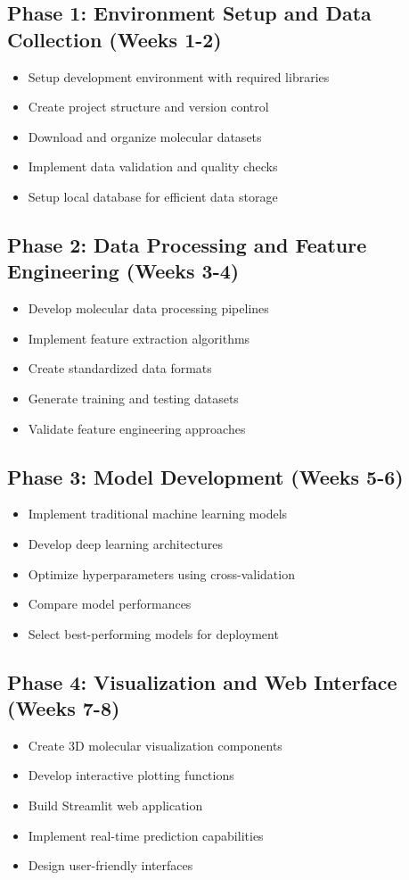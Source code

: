 \documentclass[12pt,a4paper]{article}
\begin{document}
\subsection{Phase 1: Environment Setup and Data Collection (Weeks 1-2)}
\begin{itemize}
    \item Setup development environment with required libraries
    \item Create project structure and version control
    \item Download and organize molecular datasets
    \item Implement data validation and quality checks
    \item Setup local database for efficient data storage
\end{itemize}

\subsection{Phase 2: Data Processing and Feature Engineering (Weeks 3-4)}
\begin{itemize}
    \item Develop molecular data processing pipelines
    \item Implement feature extraction algorithms
    \item Create standardized data formats
    \item Generate training and testing datasets
    \item Validate feature engineering approaches
\end{itemize}

\subsection{Phase 3: Model Development (Weeks 5-6)}
\begin{itemize}
    \item Implement traditional machine learning models
    \item Develop deep learning architectures
    \item Optimize hyperparameters using cross-validation
    \item Compare model performances
    \item Select best-performing models for deployment
\end{itemize}

\subsection{Phase 4: Visualization and Web Interface (Weeks 7-8)}
\begin{itemize}
    \item Create 3D molecular visualization components
    \item Develop interactive plotting functions
    \item Build Streamlit web application
    \item Implement real-time prediction capabilities
    \item Design user-friendly interfaces
\end{itemize}
\end{document}
